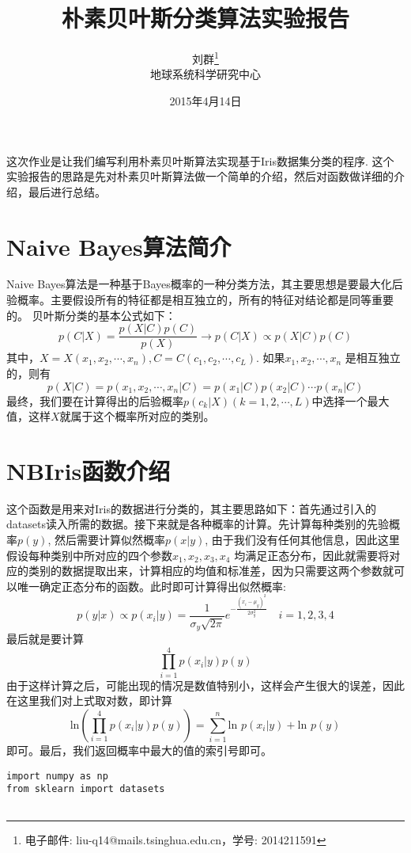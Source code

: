 \documentclass[a4paper, 1pt]{article}
\newcommand{\xiaosihao}{\fontsize{12pt}{\baselineskip}\selectfont}
\newcommand{\wuhao}{\fontsize{10.5pt}{\baselineskip}\selectfont}
\newcommand{\xiaowuhao}{\fontsize{9pt}{\baselineskip}\selectfont}
\begin{document}
\begin{spacing}{1.0}

\title{朴素贝叶斯分类算法实验报告}
\author{\wuhao 刘群\footnote{电子邮件: liu-q14@mails.tsinghua.edu.cn，学号: 2014211591}\\[2ex]
\wuhao 地球系统科学研究中心\\
}
\date{\wuhao 2015年4月14日}
\maketitle

\xiaowuhao 这次作业是让我们编写利用朴素贝叶斯算法实现基于Iris数据集分类的程序. 这个实验报告的思路是先对朴素贝叶斯算法做一个简单的介绍，然后对函数做详细的介绍，最后进行总结。
\section{\xiaosihao Naive Bayes算法简介}
Naive Bayes算法是一种基于Bayes概率的一种分类方法，其主要思想是要最大化后验概率。主要假设所有的特征都是相互独立的，所有的特征对结论都是同等重要的。
贝叶斯分类的基本公式如下：
$$p(C|X) = \frac{p(X|C)p(C)}{p(X)} \rightarrow p(C|X) \propto p(X|C)p(C)$$
其中，$X=X(x_1, x_2, \cdots, x_n), C=C(c_1, c_2, \cdots, c_L)$. 如果$x_1, x_2, \cdots, x_n$ 是相互独立的，则有
$$p(X|C)=p(x_1,x_2,\cdots,x_n | C) = p(x_1|C)p(x_2|C)\cdots p(x_n|C)$$
最终，我们要在计算得出的后验概率$p(c_k|X)(k=1,2,\cdots,L)$中选择一个最大值，这样$X$就属于这个概率所对应的类别。

\section{\xiaosihao NBIris函数介绍}
这个函数是用来对Iris的数据进行分类的，其主要思路如下：首先通过引入的datasets读入所需的数据。接下来就是各种概率的计算。先计算每种类别的先验概率$p(y)$, 然后需要计算似然概率$p(x|y)$, 由于我们没有任何其他信息，因此这里假设每种类别中所对应的四个参数$x_1, x_2, x_3, x_4$ 均满足正态分布，因此就需要将对应的类别的数据提取出来，计算相应的均值和标准差，因为只需要这两个参数就可以唯一确定正态分布的函数。此时即可计算得出似然概率:
$$p(y|x) \propto p(x_i|y) = \frac{1}{\sigma_y\sqrt{2\pi}}e^{-\frac{(x_i-\mu_y)^2}{2\sigma_y^2}}\quad i=1,2,3,4$$
最后就是要计算
$$\prod_{i=1}^4p(x_i|y)p(y)$$
由于这样计算之后，可能出现的情况是数值特别小，这样会产生很大的误差，因此在这里我们对上式取对数，即计算
$$\text{ln}\left(\prod_{i=1}^4p(x_i|y)p(y)\right)=\sum_{i=1}^n\text{ln }p(x_i|y)+ \text{ln }p(y)$$
即可。最后，我们返回概率中最大的值的索引号即可。
\begin{lstlisting}
import numpy as np
from sklearn import datasets


\end{lstlisting}
\end{spacing}
\end{document}
